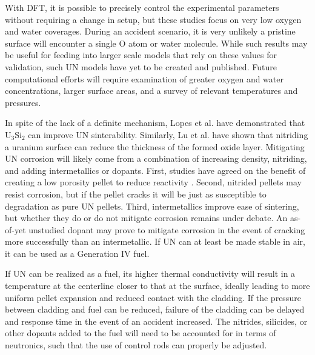 \documentclass[11pt]{article}
\begin{document}
\begin{multicols}{2}
\par With DFT, it is possible to precisely control the experimental parameters without requiring a change in setup, but these studies focus on very low oxygen and water coverages. During an accident scenario, it is very unlikely a pristine surface will encounter a single O atom or water molecule. While such results may be useful for feeding into larger scale models that rely on these values for validation, such UN models have yet to be created and published. 
Future computational efforts will require examination of greater oxygen and water concentrations, larger surface areas, and a survey of relevant temperatures and pressures.
\par In spite of the lack of a definite mechanism, Lopes et al. \cite{Lopes2017} have demonstrated that U$_{3}$Si$_{2}$ can improve UN sinterability. Similarly, Lu et al. \cite{Lu2016} have shown that nitriding a uranium surface can reduce the thickness of the formed oxide layer.
Mitigating UN corrosion will likely come from a combination of increasing density, nitriding, and adding intermetallics or dopants. First, studies have agreed on the benefit of creating a low porosity pellet to reduce reactivity \cite{Lopes2017,Johnson2016,Jolkkonen2017}. Second, nitrided pellets may resist corrosion, but if the pellet cracks it will be just as susceptible to degradation as pure UN pellets. Third, intermetallics improve ease of sintering, but whether they do or do not mitigate corrosion remains under debate. An as-of-yet unstudied dopant may prove to mitigate corrosion in the event of cracking more successfully than an intermetallic. If UN can at least be made stable in air, it can be used as a Generation IV fuel.
\par 
If UN can be realized as a fuel, its higher thermal conductivity will result in a temperature at the centerline closer to that at the surface, ideally leading to more uniform pellet expansion and reduced contact with the cladding. If the pressure between cladding and fuel can be reduced, failure of the cladding can be delayed and response time in the event of an accident increased. The nitrides, silicides, or other dopants added to the fuel will need to be accounted for in terms of neutronics, such that the use of control rods can properly be adjusted.

\par 


\end{multicols}
\end{document}
